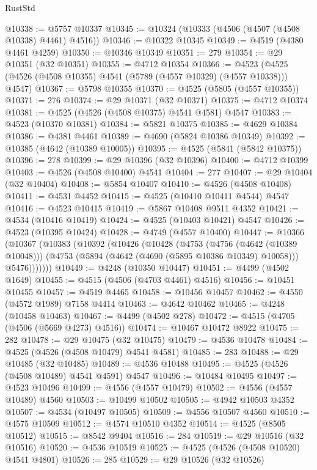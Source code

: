 \begin{lexlean}{RustStd}
\begin{coremodule}
@10338 := @5757 @10337
@10345 := @10324 (@10333 (@4506 (@4507 (@4508 @10338) @4461) @4516))
@10346 := @10322 @10345
@10349 := @4519 (@4380 @4461 @4259)
@10350 := @10346 @10349
@10351 := 279
@10354 := @29 @10351 (@32 @10351)
@10355 := @4712 @10354
@10366 := @4523 (@4525 (@4526 (@4508 @10355) @4541 (@5789 (@4557 @10329) (@4557 @10338))) @4547)
@10367 := @5798 @10355
@10370 := @4525 (@5805 (@4557 @10355))
@10371 := 276
@10374 := @29 @10371 (@32 @10371)
@10375 := @4712 @10374
@10381 := @4525 (@4526 (@4508 @10375) @4541 @4581) @4547
@10383 := @4523 (@10370 @10381)
@10384 := @5821 @10375
@10385 := @4629 @10384
@10386 := @4381 @4461
@10389 := @4690 (@5824 @10386 @10349)
@10392 := @10385 (@4642 (@10389 @10005))
@10395 := @4525 (@5841 (@5842 @10375))
@10396 := 278
@10399 := @29 @10396 (@32 @10396)
@10400 := @4712 @10399
@10403 := @4526 (@4508 @10400) @4541
@10404 := 277
@10407 := @29 @10404 (@32 @10404)
@10408 := @5854 @10407
@10410 := @4526 (@4508 @10408)
@10411 := @4531 @4452
@10415 := @4525 (@10410 @10411 @4544) @4547
@10416 := @4523 @10415
@10419 := @5867 @10408 @9511 @4352
@10421 := @4534 (@10416 @10419)
@10424 := @4525 (@10403 @10421) @4547
@10426 := @4523 (@10395 @10424)
@10428 := @4749 (@4557 @10400)
@10447 := @10366
    (@10367
      (@10383
        (@10392
          (@10426
            (@10428
              (@4753
                (@4756 (@4642 (@10389 @10048)))
                (@4753 (@5894 (@4642 (@4690 (@5895 @10386 @10349) @10058))) @5476)))))))
@10449 := @4248 (@10350 @10447)
@10451 := @4499 (@4502 @1649)
@10455 := @4515 (@4506 (@4703 @4461) @4516)
@10456 := @10451 @10455
@10457 := @4519 @4465
@10458 := @10456 @10457
@10462 := @4550 (@4572 @1989) @7158 @4414
@10463 := @4642 @10462
@10465 := @4248 (@10458 @10463)
@10467 := @4499 (@4502 @278)
@10472 := @4515 (@4705 (@4506 (@5669 @4273) @4516))
@10474 := @10467 @10472 @8922
@10475 := 282
@10478 := @29 @10475 (@32 @10475)
@10479 := @4536 @10478
@10484 := @4525 (@4526 (@4508 @10479) @4541 @4581)
@10485 := 283
@10488 := @29 @10485 (@32 @10485)
@10489 := @4536 @10488
@10495 := @4525 (@4526 (@4508 @10489) @4541 @4591) @4547
@10496 := @10484 @10495
@10497 := @4523 @10496
@10499 := @4556 (@4557 @10479)
@10502 := @4556 (@4557 @10489) @4560
@10503 := @10499 @10502
@10505 := @4942 @10503 @4352
@10507 := @4534 (@10497 @10505)
@10509 := @4556 @10507 @4560
@10510 := @4575 @10509
@10512 := @4574 @10510 @4352
@10514 := @4525 (@8505 @10512)
@10515 := @8542 @9404
@10516 := 284
@10519 := @29 @10516 (@32 @10516)
@10520 := @4536 @10519
@10525 := @4525 (@4526 (@4508 @10520) @4541 @4801)
@10526 := 285
@10529 := @29 @10526 (@32 @10526)

\end{coremodule}
\end{lexlean}
